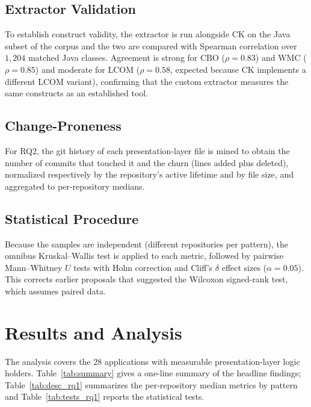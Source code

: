 \documentclass[conference]{IEEEtran}
\begin{document}
\subsection{Extractor Validation}
To establish construct validity, the extractor is run alongside CK
\cite{Aniche:2015} on the Java subset of the corpus and the two are compared with
Spearman correlation over $1{,}204$ matched Java classes. Agreement is strong for
CBO ($\rho=0.83$) and WMC ($\rho=0.85$) and moderate for LCOM ($\rho=0.58$,
expected because CK implements a different LCOM variant), confirming that the
custom extractor measures the same constructs as an established tool.

\subsection{Change-Proneness}
For RQ2, the git history of each presentation-layer file is mined to obtain the
number of commits that touched it and the churn (lines added plus deleted),
normalized respectively by the repository's active lifetime and by file size, and
aggregated to per-repository medians.

\subsection{Statistical Procedure}
Because the samples are independent (different repositories per pattern), the
omnibus Kruskal--Wallis test is applied to each metric, followed by pairwise
Mann--Whitney $U$ tests with Holm correction and Cliff's $\delta$ effect sizes
($\alpha=0.05$). This corrects earlier proposals that suggested the Wilcoxon
signed-rank test, which assumes paired data.

\section{Results and Analysis} \label{sec:Results}

The analysis covers the $28$ applications with measurable presentation-layer
logic holders. Table~\ref{tab:summary} gives a one-line summary of the headline
findings; Table~\ref{tab:desc_rq1} summarizes the per-repository median metrics by
pattern and Table~\ref{tab:tests_rq1} reports the statistical tests.
\end{document}
